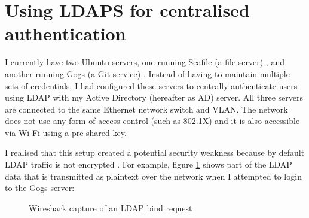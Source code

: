 \documentclass[11pt,a4paper]{scrartcl}
\begin{document}
\newpage

\section*{Using LDAPS for centralised authentication}
\begin{refsection}

I currently have two Ubuntu servers, one running Seafile (a file server) \cite{seafile}, and another running Gogs (a Git service) \cite{gogs}. Instead of having to maintain multiple sets of credentials, I had configured these servers to centrally authenticate users using LDAP \cite{RFC4510} with my Active Directory (hereafter as AD) server. All three servers are connected to the same Ethernet network switch and VLAN. The network does not use any form of access control (such as 802.1X) and it is also accessible via Wi-Fi using a pre-shared key.

I realised that this setup created a potential security weakness because by default LDAP traffic is not encrypted \cite[sec 6.1]{RFC4513} \cite{microsoft_enable_ldaps}. For example, figure \ref{fig:wireshark_ldap} shows part of the LDAP data that is transmitted as plaintext over the network when I attempted to login to the Gogs server:

\begin{figure}[h]
	\centering
	\qquad
	\caption{Wireshark capture of an LDAP bind request}
	\label{fig:wireshark_ldap}
\end{figure}


\end{refsection}
\end{document}
